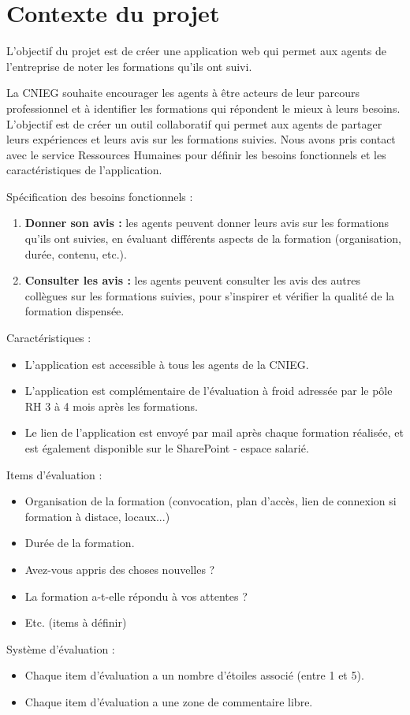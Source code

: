 \chapter*{Contexte du projet}

L’objectif du projet est de créer une application web qui permet aux agents de l’entreprise de noter les formations qu’ils ont suivi.
\medskip

La CNIEG souhaite encourager les agents à être acteurs de leur parcours professionnel et à identifier les formations qui répondent le mieux à leurs besoins. L'objectif est de créer un outil collaboratif qui permet aux agents de partager leurs expériences et leurs avis sur les formations suivies. 
Nous avons pris contact avec le service Ressources Humaines pour définir les besoins fonctionnels et les caractéristiques de l’application.
\medskip

Spécification des besoins fonctionnels :
\begin{enumerate}[leftmargin=2cm]
    \item \textbf{Donner son avis :} les agents peuvent donner leurs avis sur les formations qu'ils ont suivies, en évaluant différents aspects de la formation (organisation, durée, contenu, etc.).
    \item \textbf{Consulter les avis :} les agents peuvent consulter les avis des autres collègues sur les formations suivies, pour s'inspirer et vérifier la qualité de la formation dispensée.
\end{enumerate}
\medskip

Caractéristiques :
\medskip
\begin{itemize}[leftmargin=2cm]
    \item L'application est accessible à tous les agents de la CNIEG.
    \item L'application est complémentaire de l'évaluation à froid adressée par le pôle RH 3 à 4 mois après les formations.
    \item Le lien de l'application est envoyé par mail après chaque formation réalisée, et est également disponible sur le SharePoint - espace salarié.
\end{itemize}
\medskip

Items d'évaluation :
\medskip
\begin{itemize}[leftmargin=2cm]
    \item Organisation de la formation (convocation, plan d'accès, lien de connexion si formation à distace, locaux...)
    \item Durée de la formation.
    \item Avez-vous appris des choses nouvelles ?
    \item La formation a-t-elle répondu à vos attentes ?
    \item Etc. (items à définir)
\end{itemize}
\medskip

Système d'évaluation :
\medskip
\begin{itemize}[leftmargin=2cm]
    \item Chaque item d'évaluation a un nombre d'étoiles associé (entre 1 et 5).
    \item Chaque item d'évaluation a une zone de commentaire libre.
\end{itemize}